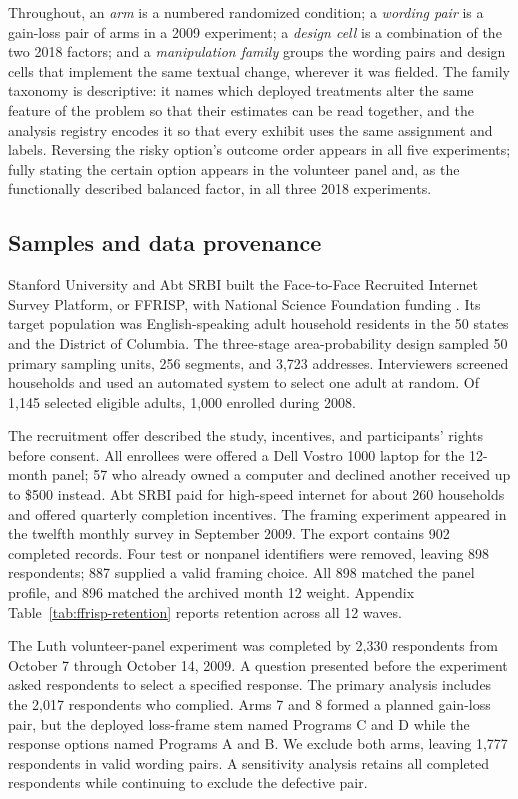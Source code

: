\documentclass[11pt]{article}
\begin{document}
Throughout, an \emph{arm} is a numbered randomized condition; a \emph{wording pair} is a gain-loss pair of arms in a 2009 experiment; a \emph{design cell} is a combination of the two 2018 factors; and a \emph{manipulation family} groups the wording pairs and design cells that implement the same textual change, wherever it was fielded. The family taxonomy is descriptive: it names which deployed treatments alter the same feature of the problem so that their estimates can be read together, and the analysis registry encodes it so that every exhibit uses the same assignment and labels. Reversing the risky option's outcome order appears in all five experiments; fully stating the certain option appears in the volunteer panel and, as the functionally described balanced factor, in all three 2018 experiments.

\subsection{Samples and data provenance}

Stanford University and Abt SRBI built the Face-to-Face Recruited Internet Survey Platform, or FFRISP, with National Science Foundation funding \parencite{ackermann2009ffrisp}. Its target population was English-speaking adult household residents in the 50 states and the District of Columbia. The three-stage area-probability design sampled 50 primary sampling units, 256 segments, and 3,723 addresses. Interviewers screened households and used an automated system to select one adult at random. Of 1,145 selected eligible adults, 1,000 enrolled during 2008.

The recruitment offer described the study, incentives, and participants' rights before consent. All enrollees were offered a Dell Vostro 1000 laptop for the 12-month panel; 57 who already owned a computer and declined another received up to \$500 instead. Abt SRBI paid for high-speed internet for about 260 households and offered quarterly completion incentives. The framing experiment appeared in the twelfth monthly survey in September 2009. The export contains 902 completed records. Four test or nonpanel identifiers were removed, leaving 898 respondents; 887 supplied a valid framing choice. All 898 matched the panel profile, and 896 matched the archived month 12 weight. Appendix Table~\ref{tab:ffrisp-retention} reports retention across all 12 waves.

The Luth volunteer-panel experiment was completed by 2,330 respondents from October 7 through October 14, 2009. A question presented before the experiment asked respondents to select a specified response. The primary analysis includes the 2,017 respondents who complied. Arms 7 and 8 formed a planned gain-loss pair, but the deployed loss-frame stem named Programs C and D while the response options named Programs A and B. We exclude both arms, leaving 1,777 respondents in valid wording pairs. A sensitivity analysis retains all completed respondents while continuing to exclude the defective pair.
\end{document}
